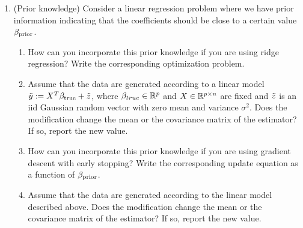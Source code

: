 \documentclass[12pt,twoside]{article}
\begin{document}
\begin{enumerate}
 \item (Prior knowledge) Consider a linear regression problem where we have prior information indicating that the coefficients should be close to a certain value $\beta_{\operatorname{prior}}$. 
 \begin{enumerate}
   \item How can you incorporate this prior knowledge if you are using ridge regression? Write the corresponding optimization problem. 
   \item Assume that the data are generated according to a linear model $\tilde{ y }:= X^T \beta_{\operatorname{true}} + \tilde{ z }$, where $\beta_{true}\in \mathbb{R}^{p}$ and $X  \in \mathbb{R}^{p \times n}$ are fixed and $\tilde{ z }$ is an iid Gaussian random vector with zero mean and variance $\sigma^2$. Does the modification change the mean or the covariance matrix of the estimator? If so, report the new value.
    \item How can you incorporate this prior knowledge if you are using gradient descent with early stopping? Write the corresponding update equation as a function of $\beta_{\operatorname{prior}}$.
    \item Assume that the data are generated according to the linear model described above. Does the modification change the mean or the covariance matrix of the estimator? If so, report the new value.
 \end{enumerate}
 

\end{enumerate}
\end{document}
